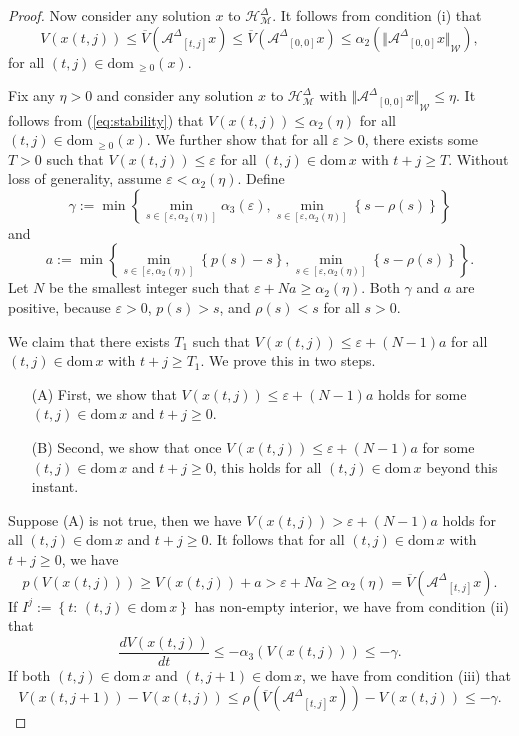 \documentclass[journal,final,twocolumn]{IEEEtran}
\theoremstyle{definition}
\begin{document}
\begin{proof}
Now consider any solution $x$ to ${\mathcal{H}_{\mathcal{M}}^{\Delta}}$. It follows from condition (i) that
\begin{equation}\label{eq:stability}
V(x(t,j))\le \overline{V}({\mathcal{A}^{\Delta}}_{[t,j]}x)\le \overline{V}({\mathcal{A}^{\Delta}}_{[0,0]}x) \le \alpha_2({\Vert{{\mathcal{A}^{\Delta}}_{[0,0]}x}\Vert}_{\mathcal{W}}),
\end{equation}
for all $(t,j)\in{\text{dom}\,}_{\ge 0}(x)$.

Fix any $\eta>0$ and consider any solution $x$ to ${\mathcal{H}_{\mathcal{M}}^{\Delta}}$ with ${\Vert{{\mathcal{A}^{\Delta}}_{[0,0]}x}\Vert}_{\mathcal{W}}\le \eta$. It follows from (\ref{eq:stability}) that $V(x(t,j))\le \alpha_2(\eta)$ for all $(t,j)\in{\text{dom}\,}_{\ge 0}(x)$. We further show that for all ${\varepsilon}>0$, there exists some $T>0$ such that $V(x(t,j))\le {\varepsilon}$ for all $(t,j)\in{\text{dom}\,} x$ with $t+j\ge T$. Without loss of generality, assume ${\varepsilon}<\alpha_2(\eta)$. Define
$$
\gamma:=\min{\left\{{\min_{s\in [{\varepsilon},\alpha_2(\eta)]}\alpha_3({\varepsilon}),\min_{s\in [{\varepsilon},\alpha_2(\eta)]}{\left\{{s-\rho(s)}\right\}}}\right\}}
$$
and
$$
a:=\min{\left\{{\min_{s\in [{\varepsilon},\alpha_2(\eta)]}{\left\{{p(s)-s}\right\}},\min_{s\in [{\varepsilon},\alpha_2(\eta)]}{\left\{{s-\rho(s)}\right\}}}\right\}}.
$$
Let $N$ be the smallest integer such that ${\varepsilon}+Na\ge \alpha_2(\eta)$. Both $\gamma$ and $a$ are positive, because ${\varepsilon}>0$, $p(s)>s$, and $\rho(s)<s$ for all $s>0$.

We claim that there exists $T_1$ such that $V(x(t,j))\le {\varepsilon}+(N-1)a$ for all $(t,j)\in{\text{dom}\,} x$ with $t+j\ge T_1$. We prove this in two steps.
\begin{itemize}
\item[(A)] First, we show that  $V(x(t,j))\le {\varepsilon}+(N-1)a$ holds for some $(t,j)\in{\text{dom}\,} x$ and $t+j\ge 0$.
\item[(B)] Second, we show that once $V(x(t,j))\le {\varepsilon}+(N-1)a$ for some $(t,j)\in{\text{dom}\,} x$ and $t+j\ge 0$, this holds for all $(t,j)\in{\text{dom}\,} x$ beyond this instant.
\end{itemize}
Suppose (A) is not true, then we have $V(x(t,j))>{\varepsilon}+(N-1)a$ holds for all $(t,j)\in{\text{dom}\,} x$ and $t+j\ge 0$. It follows that for all $(t,j)\in {\text{dom}\,} x$ with $t+j\ge 0$, we have
$$
p(V(x(t,j)))\ge V(x(t,j))+a > {\varepsilon}+Na \ge \alpha_2(\eta)= \overline{V}({\mathcal{A}^{\Delta}}_{[t,j]}x).
$$
If $I^j:={\left\{{t:\,(t,j)\in {\text{dom}\,} x}\right\}}$ has non-empty interior, we have from condition (ii) that
\begin{equation}\label{eq:decay2}
\frac{dV(x(t,j))}{dt} \le - \alpha_3(V(x(t,j))) \le -\gamma.
\end{equation}
If both $(t,j)\in{\text{dom}\,} x$ and $(t,j+1)\in{\text{dom}\,} x$, we have from condition (iii) that
\begin{equation}\label{eq:decay1}
V(x(t,j+1)) - V(x(t,j)) \le \rho(\overline{V}({\mathcal{A}^{\Delta}}_{[t,j]}x))-V(x(t,j))\le -\gamma.
\end{equation}


\end{proof}
\end{document}
